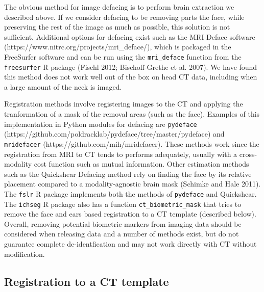 \documentclass[]{elsarticle} %
\begin{document}
The obvious method for image defacing is to perform brain extraction we described above. If we consider defacing to be removing parts the face, while preserving the rest of the image as much as possible, this solution is not sufficient. Additional options for defacing exist such as the MRI Deface software (https://www.nitrc.org/projects/mri\_deface/), which is packaged in the FreeSurfer software and can be run using the \texttt{mri\_deface} function from the \texttt{freesurfer} R package (Fischl 2012; Bischoff-Grethe et al. 2007). We have found this method does not work well out of the box on head CT data, including when a large amount of the neck is imaged.

Registration methods involve registering images to the CT and applying the tranformation of a mask of the removal areas (such as the face). Examples of this implementation in Python modules for defacing are \texttt{pydeface} (https://github.com/poldracklab/pydeface/tree/master/pydeface) and \texttt{mridefacer} (https://github.com/mih/mridefacer). These methods work since the registration from MRI to CT tends to performs adequately, usually with a cross-modality cost function such as mutual information. Other estimation methods such as the Quickshear Defacing method rely on finding the face by its relative placement compared to a modality-agnostic brain mask (Schimke and Hale 2011). The \texttt{fslr} R package implements both the methods of \texttt{pydeface} and Quickshear. The \texttt{ichseg} R package also has a function \texttt{ct\_biometric\_mask} that tries to remove the face and ears based registration to a CT template (described below). Overall, removing potential biometric markers from imaging data should be considered when releasing data and a number of methods exist, but do not guarantee complete de-identfication and may not work directly with CT without modification.

\hypertarget{registration-to-a-ct-template}{%
\subsection{Registration to a CT template}\label{registration-to-a-ct-template}}
\end{document}
